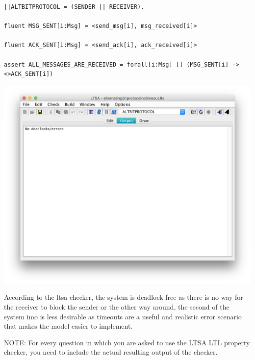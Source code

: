 \documentclass{article}
\begin{document}
\begin{enumerate}
\begin{enumerate}
\begin{verbatim}
||ALTBITPROTOCOL = (SENDER || RECEIVER).

fluent MSG_SENT[i:Msg] = <send_msg[i], msg_received[i]>

fluent ACK_SENT[i:Msg] = <send_ack[i], ack_received[i]>

assert ALL_MESSAGES_ARE_RECEIVED = forall[i:Msg] [] (MSG_SENT[i] -> <>ACK_SENT[i])

\end{verbatim}
\includegraphics[scale=0.5]{nodeadlocks2.png}

According to the ltsa checker, the system is deadlock free as there is no way for the receiver to block the sender or the other way around, the second of the system imo is less desirable as timeouts are a useful and realistic error scenario that makes the model easier to implement. \\
\end{enumerate}
NOTE: For every question in which you are asked to use the LTSA LTL
property checker, you need to include the actual resulting output of
the checker.

\end{enumerate}
\end{document}
